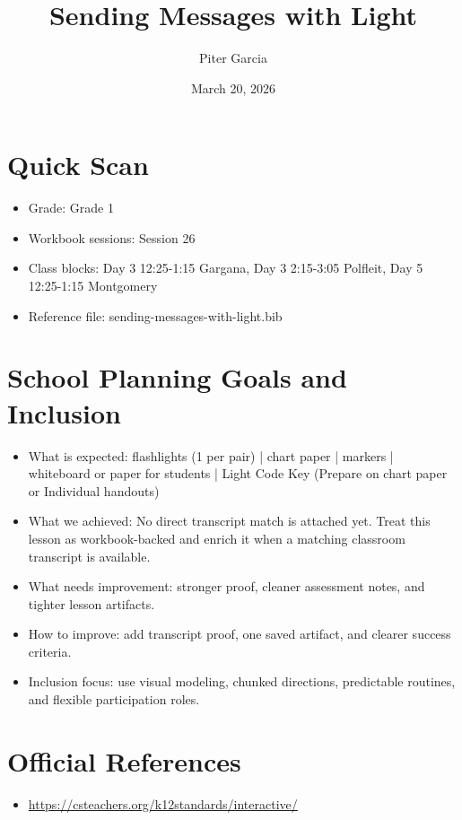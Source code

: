 \documentclass[11pt]{article}
\title{Sending Messages with Light}
\author{Piter Garcia}
\date{March 20, 2026}
\begin{document}
\maketitle
\section*{Quick Scan}
\begin{itemize}[leftmargin=*]
\item Grade: Grade 1
\item Workbook sessions: Session 26
\item Class blocks: Day 3 12:25-1:15 Gargana, Day 3 2:15-3:05 Polfleit, Day 5 12:25-1:15 Montgomery
\item Reference file: sending-messages-with-light.bib
\end{itemize}
\section*{School Planning Goals and Inclusion}
\begin{itemize}[leftmargin=*]
\item What is expected: flashlights (1 per pair) | chart paper | markers | whiteboard or paper for students | Light Code Key (Prepare on chart paper or Individual handouts)
\item What we achieved: No direct transcript match is attached yet. Treat this lesson as workbook-backed and enrich it when a matching classroom transcript is available.
\item What needs improvement: stronger proof, cleaner assessment notes, and tighter lesson artifacts.
\item How to improve: add transcript proof, one saved artifact, and clearer success criteria.
\item Inclusion focus: use visual modeling, chunked directions, predictable routines, and flexible participation roles.
\end{itemize}
\section*{Official References}
\begin{itemize}[leftmargin=*]
\item \url{https://csteachers.org/k12standards/interactive/}

\end{itemize}
\end{document}
